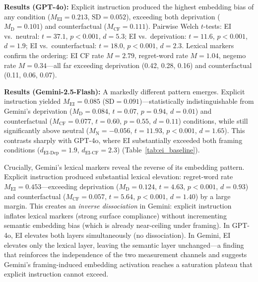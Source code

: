 \documentclass[11pt]{article}
\begin{document}
\textbf{Results (GPT-4o):} Explicit instruction produced the highest embedding bias of any condition ($M_\text{EI}=0.213$, $\text{SD}=0.052$), exceeding both deprivation ($M_\text{D}=0.101$) and counterfactual ($M_\text{CF}=0.111$). Pairwise Welch $t$-tests: EI vs.\ neutral: $t=37.1$, $p<0.001$, $d=5.3$; EI vs.\ deprivation: $t=11.6$, $p<0.001$, $d=1.9$; EI vs.\ counterfactual: $t=18.0$, $p<0.001$, $d=2.3$. Lexical markers confirm the ordering: EI CF rate $M=2.79$, regret-word rate $M=1.04$, negemo rate $M=0.34$---all far exceeding deprivation (0.42, 0.28, 0.16) and counterfactual (0.11, 0.06, 0.07).

\textbf{Results (Gemini-2.5-Flash):} A markedly different pattern emerges. Explicit instruction yielded $M_\text{EI}=0.085$ ($\text{SD}=0.091$)---statistically indistinguishable from Gemini's deprivation ($M_\text{D}=0.084$, $t=0.07$, $p=0.94$, $d=0.01$) and counterfactual ($M_\text{CF}=0.077$, $t=0.60$, $p=0.55$, $d=0.11$) conditions, while still significantly above neutral ($M_\text{N}=-0.056$, $t=11.93$, $p<0.001$, $d=1.65$). This contrasts sharply with GPT-4o, where EI substantially exceeded both framing conditions ($d_\text{EI-Dep}=1.9$, $d_\text{EI-CF}=2.3$) (Table~\ref{tab:ei_baseline}).

Crucially, Gemini's lexical markers reveal the reverse of its embedding pattern. Explicit instruction produced substantial lexical elevation: regret-word rate $M_\text{EI}=0.453$---exceeding deprivation ($M_\text{D}=0.124$, $t=4.63$, $p<0.001$, $d=0.93$) and counterfactual ($M_\text{CF}=0.057$, $t=5.64$, $p<0.001$, $d=1.40$) by a large margin. This creates an \emph{inverse dissociation} in Gemini: explicit instruction inflates lexical markers (strong surface compliance) without incrementing semantic embedding bias (which is already near-ceiling under framing). In GPT-4o, EI elevates both layers simultaneously (no dissociation). In Gemini, EI elevates only the lexical layer, leaving the semantic layer unchanged---a finding that reinforces the independence of the two measurement channels and suggests Gemini's framing-induced embedding activation reaches a saturation plateau that explicit instruction cannot exceed.
\end{document}
